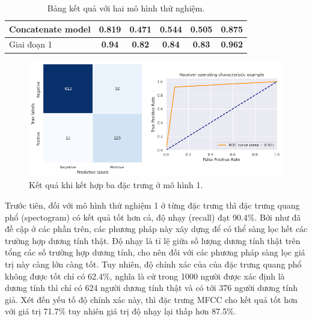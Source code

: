 \documentclass[a4paper, 12pt]{article}
\begin{document}
\begin{table}[!h]
\begin{tabular}{|l|c|c|c|c|c|}
Concatenate model                             & 0.819                                           & 0.471                                            & 0.544                                         & 0.505                                           & 0.875                                              \\ \hline
Giai đoạn 1                                   & \textbf{0.94}                                   & \textbf{0.82}                                    & \textbf{0.84}                                 & \textbf{0.83}                                   & \textbf{0.962}                                     \\ \hline
\end{tabular}
\caption{Bảng kết quả với hai mô hình thử nghiệm.}
\end{table}

\begin{figure}[!h]
\captionsetup{width=0.8\textwidth}
\centering
\includegraphics[width=16cm]{images/5.5.png}
\caption{Kết quả khi kết hợp ba đặc trưng ở mô hình 1.}
\end{figure}


\noindent
Trước tiên, đối với mô hình thử nghiệm 1 ở từng đặc trưng thì đặc trưng quang phổ (spectogram) có kết quả tốt hơn cả, độ nhạy (recall) đạt 90.4\%. Bởi như đã đề cập ở các phần trên, các phương pháp này xây dựng để có thể sàng lọc hết các trường hợp dương tính thật. Độ nhạy là tỉ lệ giữa số lượng dương tính thật trên tổng các số trường hợp dương tính, cho nên đối với các phương pháp sàng lọc giá trị này càng lớn càng tốt. Tuy nhiên, độ chính xác của của đặc trưng quang phổ không được tốt chỉ có 62.4\%, nghĩa là cứ trong 1000 người được xác định là dương tính thì chỉ có 624 người dương tính thật và có tới 376 người dương tính giả. Xét đến yếu tố độ chính xác này, thì đặc trưng MFCC cho kết quả tốt hơn với giá trị 71.7\% tuy nhiên giá trị độ nhạy lại thấp hơn 87.5\%. \\
\end{document}
